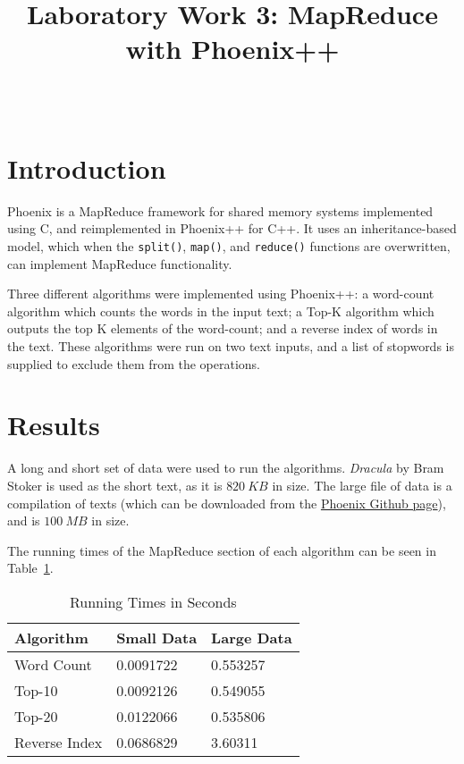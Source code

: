 \documentclass[12pt,onecolumn]{IEEEtran}
\begin{document}
	\title{Laboratory Work 3: MapReduce with Phoenix++}
	
	\author{\\
		}
	
	\maketitle
	\thispagestyle{empty}
	
	\section{Introduction}
	
	Phoenix is a MapReduce framework for shared memory systems implemented using C, and reimplemented in Phoenix++ for C++. It uses an inheritance-based model, which when the \verb|split()|, \verb|map()|, and \verb|reduce()| functions are overwritten, can implement MapReduce functionality.
	
	Three different algorithms were implemented using Phoenix++: a word-count algorithm which counts the words in the input text; a Top-K algorithm which outputs the top K elements of the word-count; and a reverse index of words in the text. These algorithms were run on two text inputs, and a list of stopwords is supplied to exclude them from the operations.
	
	\section{Results}
	
	A long and short set of data were used to run the algorithms. \textit{Dracula} by Bram Stoker is used as the short text, as it is $820~KB$ in size. The large file of data is a compilation of texts (which can be downloaded from the \href{https://github.com/kozyraki/phoenix}{Phoenix Github page}), and is $100~MB$ in size.
	
	The running times of the MapReduce section of each algorithm can be seen in Table~\ref{tbl:time}.
	
	\begin{table}[h]
		\centering \caption{Running Times in Seconds} \label{tbl:time}
		\begin{tabular}{lll}
			\hline
			Algorithm     & Small Data & Large Data \\ \hline
			Word Count    & 0.0091722  & 0.553257   \\
			Top-10        & 0.0092126  & 0.549055   \\
			Top-20        & 0.0122066  & 0.535806   \\
			Reverse Index & 0.0686829  & 3.60311    \\ \hline
		\end{tabular}
	\end{table}
\end{document}
